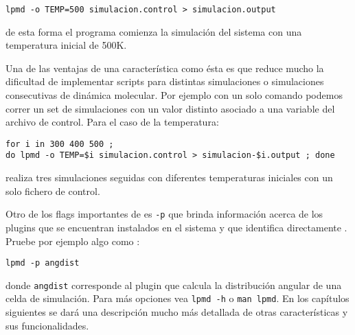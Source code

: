 \begin{center}
 \texttt{lpmd -o TEMP=500 simulacion.control > simulacion.output}
\end{center}

de esta forma el programa comienza la simulaci\'on del sistema con una temperatura inicial de 500K. 

Una de las ventajas de una caracter\'istica como \'esta es que reduce mucho la dificultad de implementar scripts para distintas simulaciones o simulaciones consecutivas de din\'amica molecular. Por ejemplo con un solo comando podemos correr un set de simulaciones con un valor distinto asociado a una variable del archivo de control. Para el caso de la temperatura:

\begin{center}
 \texttt{for i in 300 400 500 ; \\do lpmd -o TEMP=\$i simulacion.control > simulacion-\$i.output ; done}
\end{center}

realiza tres simulaciones seguidas con diferentes temperaturas iniciales con un solo fichero de control.


Otro de los flags importantes de {\lpmd} es \verb|-p| que brinda informaci\'on acerca de los plugins que se encuentran instalados en el sistema y que identifica directamente {\lpmd}. Pruebe por ejemplo algo como :

\begin{center}
 \texttt{lpmd -p angdist}
\end{center}

donde \verb|angdist| corresponde al plugin que calcula la distribuci\'on angular de una celda de simulaci\'on. Para m\'as opciones vea \verb|lpmd -h| o \verb|man lpmd|. En los cap\'itulos siguientes se dar\'a una descripci\'on mucho m\'as detallada de otras caracter\'isticas {\lpmd} y sus funcionalidades.
